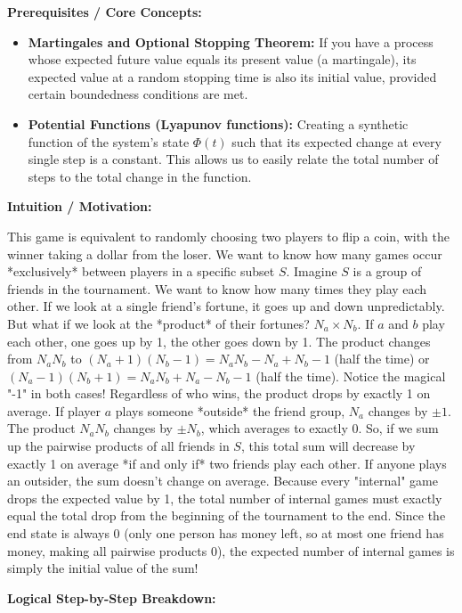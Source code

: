 \begin{solution}
\textbf{Prerequisites / Core Concepts:}
\begin{itemize}
    \item \textbf{Martingales and Optional Stopping Theorem:} If you have a process whose expected future value equals its present value (a martingale), its expected value at a random stopping time is also its initial value, provided certain boundedness conditions are met.
    \item \textbf{Potential Functions (Lyapunov functions):} Creating a synthetic function of the system's state $\Phi(t)$ such that its expected change at every single step is a constant. This allows us to easily relate the total number of steps to the total change in the function.
\end{itemize}

\textbf{Intuition / Motivation:}

This game is equivalent to randomly choosing two players to flip a coin, with the winner taking a dollar from the loser.
We want to know how many games occur *exclusively* between players in a specific subset $S$.
Imagine $S$ is a group of friends in the tournament. We want to know how many times they play each other.
If we look at a single friend's fortune, it goes up and down unpredictably. But what if we look at the *product* of their fortunes? $N_a \times N_b$.
If $a$ and $b$ play each other, one goes up by 1, the other goes down by 1. The product changes from $N_a N_b$ to $(N_a+1)(N_b-1) = N_a N_b - N_a + N_b - 1$ (half the time) or $(N_a-1)(N_b+1) = N_a N_b + N_a - N_b - 1$ (half the time).
Notice the magical "-1" in both cases! Regardless of who wins, the product drops by exactly 1 on average.
If player $a$ plays someone *outside* the friend group, $N_a$ changes by $\pm 1$. The product $N_a N_b$ changes by $\pm N_b$, which averages to exactly 0.
So, if we sum up the pairwise products of all friends in $S$, this total sum will decrease by exactly 1 on average *if and only if* two friends play each other. If anyone plays an outsider, the sum doesn't change on average.
Because every "internal" game drops the expected value by 1, the total number of internal games must exactly equal the total drop from the beginning of the tournament to the end. Since the end state is always 0 (only one person has money left, so at most one friend has money, making all pairwise products 0), the expected number of internal games is simply the initial value of the sum!

\textbf{Logical Step-by-Step Breakdown:}


\end{solution}
